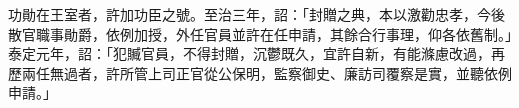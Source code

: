 \begin{pinyinscope}
功勛在王室者，許加功臣之號。至治三年，詔：「封贈之典，本以激勸忠孝，今後散官職事勛爵，依例加授，外任官員並許在任申請，其餘合行事理，仰各依舊制。」泰定元年，詔：「犯贓官員，不得封贈，沉鬱既久，宜許自新，有能滌慮改過，再歷兩任無過者，許所管上司正官從公保明，監察御史、廉訪司覆察是實，並聽依例申請。」



\end{pinyinscope}